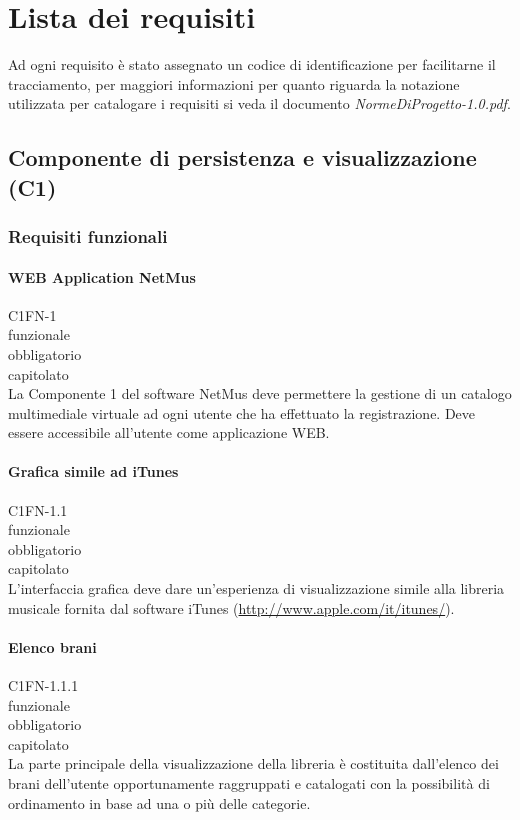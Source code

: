 \chapter{Lista dei requisiti}
\thispagestyle{fancy}
Ad ogni requisito \`e stato assegnato un codice di identificazione per facilitarne
il tracciamento, per maggiori informazioni per quanto riguarda la notazione
utilizzata per catalogare i requisiti si veda il documento
\emph{NormeDiProgetto-1.0.pdf}.

\section{Componente di persistenza e visualizzazione (C1)}
\subsection{Requisiti funzionali}

\subsubsection*{WEB Application NetMus}
 C1FN-1 \\
 funzionale \\
 obbligatorio \\
 capitolato\\
La Componente 1 del software NetMus deve permettere la gestione di un catalogo
multimediale virtuale ad ogni utente che ha effettuato la registrazione.
Deve essere accessibile all'utente come applicazione WEB.

\subsubsection*{Grafica simile ad iTunes}
 C1FN-1.1 \\
 funzionale \\
 obbligatorio \\
 capitolato \\
L'interfaccia grafica deve dare un'esperienza di visualizzazione simile alla
libreria musicale fornita dal software iTunes (\url{http://www.apple.com/it/itunes/}).

\subsubsection*{Elenco brani}
 C1FN-1.1.1 \\
 funzionale \\
 obbligatorio \\
 capitolato \\
La parte principale della visualizzazione della libreria \`e costituita
dall'elenco dei brani dell'utente opportunamente raggruppati e catalogati con la
possibilit\`a di ordinamento in base ad una o pi\`u delle categorie.

